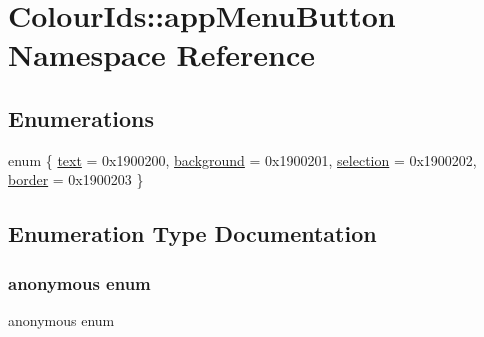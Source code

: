 \hypertarget{namespaceColourIds_1_1appMenuButton}{}\section{Colour\+Ids\+:\+:app\+Menu\+Button Namespace Reference}
\label{namespaceColourIds_1_1appMenuButton}
\subsection*{Enumerations}
\begin{DoxyCompactItemize}
\item 
enum \{ \mbox{\hyperlink{namespaceColourIds_1_1appMenuButton_a544b074afa2a00851eb80a907a4de3acafb29e057397d1ed85b0a78350099674b}{text}} = 0x1900200, 
\mbox{\hyperlink{namespaceColourIds_1_1appMenuButton_a544b074afa2a00851eb80a907a4de3aca6686360bb1ad681c1798c39a171f430e}{background}} = 0x1900201, 
\mbox{\hyperlink{namespaceColourIds_1_1appMenuButton_a544b074afa2a00851eb80a907a4de3acafb3881b90ddfade09d73bbe388e43dee}{selection}} = 0x1900202, 
\mbox{\hyperlink{namespaceColourIds_1_1appMenuButton_a544b074afa2a00851eb80a907a4de3aca904dcb8c1645067b64db622e4f77649b}{border}} = 0x1900203
 \}
\end{DoxyCompactItemize}


\subsection{Enumeration Type Documentation}
\mbox{\label{namespaceColourIds_1_1appMenuButton_a544b074afa2a00851eb80a907a4de3ac}} 
\subsubsection{\texorpdfstring{anonymous enum}{anonymous enum}}
{\footnotesize\ttfamily anonymous enum}

